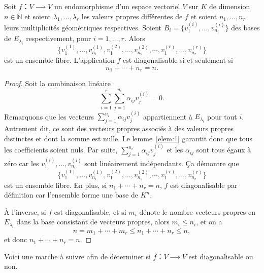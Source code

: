 \begin{corollary}
  \label{eco:1}
   Soit $f ：V ⟶V$ un endomorphisme d'un espace vectoriel $V$ sur $K$ de dimension $n ∈ ℕ$ et soient $λ_1,\dots,λ_r$
  les valeurs propres différentes de $f$
  et soient $n_1,\dots,n_r$
  leurs multiplicités géométriques respectives. Soient
  $B_i= \{v_1^{(i)},\dots,v_{n_i}^{(i)}\}$
  des bases de $E_{λ_i}$ 
  respectivement, pour $i=1,\dots,r$. Alors
  \begin{displaymath}
    \{ v_1^{(1)},\dots,v_{n_1}^{(1)},v_1^{(2)},\dots,v_{n_2}^{(2)},\cdots,v_1^{(r)},\dots,v_{n_r}^{(r)} \}
  \end{displaymath}
est un ensemble libre. L'application $f$ est diagonalisable si et seulement si
\begin{displaymath}
  n_1 + \cdots + n_r =n.
\end{displaymath}
\end{corollary}
\begin{proof}
  Soit la combinaison linéaire 
  \begin{displaymath}
    ∑_{i=1}^r ∑_{j=1}^{n_i} α_{ij} v^{(i)}_j = 0.
  \end{displaymath}
  Remarquons que les vecteurs $ ∑_{j=1}^{n_i} α_{ij} v^{(i)}_j $ appartiennent à $E_{\lambda_i}$ pour tout $i$. Autrement dit, ce sont des vecteurs propres associés à des valeurs propres distinctes et dont la somme est nulle. Le lemme~\ref{elem:1} garantit donc que tous les coefficients soient nuls. Par suite, $ ∑_{j=1}^{n_i} α_{ij} v^{(i)}_j $ et les $α_{ij}$ sont tous égaux à zéro car les $v_1^{(i)},\dots,v_{n_i}^{(i)}$ sont linéairement indépendants. Ça démontre que
   \begin{displaymath}
    \{ v_1^{(1)},\dots,v_{n_1}^{(1)},v_1^{(2)},\dots,v_{n_2}^{(2)},\cdots,v_1^{(r)},\dots,v_{n_r}^{(r)} \}	
  \end{displaymath} est un ensemble libre. En plus, si $n_1+\cdots+n_r=n$, $f$ est diagonalisable par définition car l'ensemble forme une base de $K^n$.

  À l'inverse, si $f$ est diagonalisable, et si $m_i$ dénote le nombre vecteurs propres en $E_{λ_i}$ dans la base consistant de vecteurs propres, alors $m_i ≤ n_i$, et on a
  \begin{displaymath}
    n = m_1 + \cdots + m_r ≤ n_1+ \cdots + n_r ≤n,
  \end{displaymath}
  et donc $n_1+\cdots + n_r =n$.
\end{proof}




Voici une marche à suivre afin de déterminer si $f：V ⟶V$ est diagonalisable ou non.

